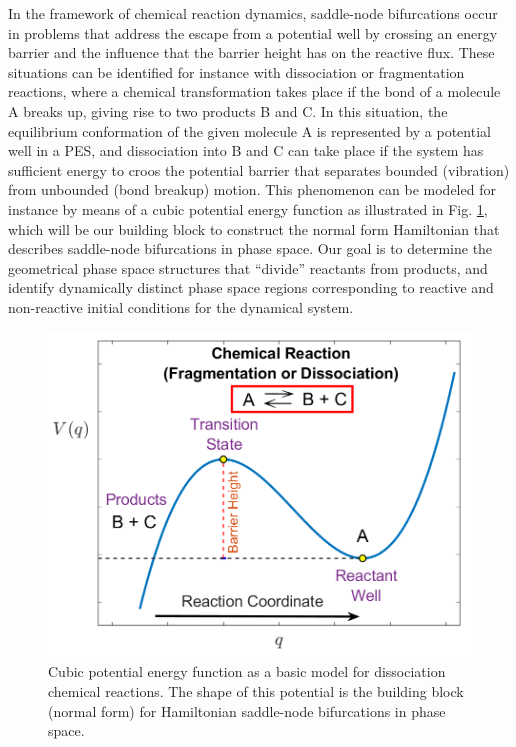 \documentclass[8pt]{article}
\begin{document}
\smallskip

In the framework of chemical reaction dynamics, saddle-node bifurcations occur in problems that address the escape from a potential well by crossing an energy barrier and the influence that the barrier height has on the reactive flux. These situations can be identified for instance with dissociation or fragmentation reactions, where a chemical transformation takes place if the bond of a molecule A breaks up, giving rise to two products B and C. In this situation, the equilibrium conformation of the given molecule A is represented by a potential well in a PES, and dissociation into B and C can take place if the system has sufficient energy to croos the potential barrier that separates bounded (vibration) from unbounded (bond breakup) motion. This phenomenon can be modeled for instance by means of a cubic potential energy function as illustrated in Fig. \ref{fig:pes_snbif}, which will be our building block to construct the normal form Hamiltonian that describes saddle-node bifurcations in phase space. Our goal is to determine the geometrical phase space structures that ``divide'' reactants from products, and identify dynamically distinct phase space regions corresponding to reactive and non-reactive initial conditions for the dynamical system.

\begin{figure}[htbp]
	\begin{center}		
		\includegraphics[scale=0.3]{fig1.png}
	\end{center}
	\caption{Cubic potential energy function as a basic model for dissociation chemical reactions. The shape of this potential is the building block (normal form) for Hamiltonian saddle-node bifurcations in phase space.}
	\label{fig:pes_snbif}
\end{figure}
\end{document}
